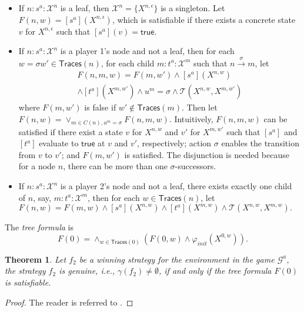 \documentclass[letterpaper, 10 pt, conference]{ieeeconf}
\newtheorem{theorem}{Theorem}
\newcommand{\truev}{\mathsf{true}}
\begin{document}
\begin{itemize}
\item If $n:s^a : \mathcal{X}^n$ is a leaf, then $\mathcal{X}^n
  =\{X^{n,\epsilon}\}$ is a singleton. Let $
  F(n,w)=[s^a](X^{n,\epsilon}) $, which is satisfiable if there exists
  a concrete state $v$ for $X^{n,\epsilon}$ such that
  $[s^a](v)=\truev$.
  
\item If $n:s^a:\mathcal{X}^n$ is a player 1's node and not a leaf,
  then for each $w =\sigma w' \in \mathsf{Traces}(n)$, for each child
  $m:t^a:\mathcal{X}^m$ such that $n\xrightarrow{\sigma} m$, let  
\vspace{-1ex}
  \begin{multline*} F(n,m,w)=F(m,w') \land [s^a](X^{n,w})\\ \land
    [t^a](X^{m,w'}) \land u^m =\sigma \land \mathcal{T}(X^{n,w},X^{m,
      w'}) \end{multline*} where $F(m,w') $ is false if $w'\notin
  \mathsf{Traces}(m)$. Then let $F(n,w )= \lor_{m \in C(n),
    u^m=\sigma} F(n,m,w)$. Intuitively, $F(n,m,w)$ can be satisfied if
  there exist a state $v$ for $X^{n,w}$ and $v'$ for $X^{m,w'}$ such
  that $[s^a]$ and $[t^a]$ evaluate to $\truev$ at $v$ and $v'$,
  respectively; action $\sigma$ enables the transition from $v $ to
  $v'$; and $F(m,w')$ is satisfied. The disjunction is needed because
  for a node $n$, there can be more than one $\sigma$-successors.
 
\item If $n:s^a: \mathcal{X}^n$ is a player 2's node and not a leaf, there
  exists exactly one child of $n$, say, $m: t^a: \mathcal{X}^m$,
then for each $w\in \mathsf{Traces}(n)$, let $
  F(n,w)=F(m,w)\land [s^a](X^{n,w})\land [t^a](X^{m,w}) \land
  \mathcal{T}(X^{n,w},X^{m,w}).$
\end{itemize}
The \emph{tree formula} is 
\vspace{-1ex}
 \[F(0)= \land_{w\in \mathsf{Traces}(0)} (F(0,w) \wedge
\varphi_{init}(X^{0,w})).\]
\begin{theorem}
  Let $f_2$ be a winning strategy for the environment in the game
  $\mathcal{G}^a$, the strategy $f_2$ is genuine, i.e.,
  $\gamma(f_2)\ne \emptyset$, if and only if the tree formula $F(0)$ is
  satisfiable.
\end{theorem}
\begin{proof}
The reader is referred to  \cite{DimitrovaF08}.
\end{proof}
\addtocounter{example}{-1}
\end{document}
